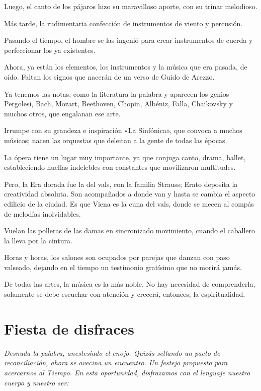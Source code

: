 \documentclass[11pt,twoside,openright,a5paper]{book}
\begin{document}
Luego, el canto de los pájaros hizo su maravilloso aporte, con su trinar melodioso.

Más tarde, la rudimentaria confección de instrumentos de viento y percusión.

Pasando el tiempo, el hombre se las ingenió para crear instrumentos de cuerda y perfeccionar los ya existentes.

Ahora, ya están los elementos, los instrumentos y la música que era pasada, de oído. Faltan los signos que nacerán de un verso de Guido de Arezzo.

Ya tenemos las notas, como la literatura la palabra y aparecen los genios Pergolesi, Bach, Mozart, Beethoven, Chopin, Albéniz, Falla, Chaikovsky y muchos otros, que engalanan ese arte.

Irrumpe con su grandeza e inspiración «La Sinfónica», que convoca a muchos músicos; nacen las orquestas que deleitan a la gente de todas las épocas.

La ópera tiene un lugar muy importante, ya que conjuga canto, drama, ballet, estableciendo huellas indelebles con constantes que movilizaron multitudes.

Pero, la Era dorada fue la del vals, con la familia Strauss; Erato deposita la creatividad absoluta. Son acompañados a donde van y hasta se cambia el aspecto edilicio de la ciudad. Es que Viena es la cuna del vals, donde se mecen al compás de melodías inolvidables.

Vuelan las polleras de las damas en sincronizado movimiento, cuando el caballero la lleva por la cintura.

Horas y horas, los salones son ocupados por parejas que danzan con paso valseado, dejando en el tiempo un testimonio gratísimo que no morirá jamás.

De todas las artes, la música es la más noble. No hay necesidad de comprenderla, solamente se debe escuchar con atención y crecerá, entonces, la espiritualidad.

\chapter*{Fiesta de disfraces}

\vspace{0.5cm}
\emph{Desnuda la palabra, anestesiado el enojo. Quizás sellando un pacto de reconciliación, ahora se avecina un encuentro. Un festejo propuesto para acercarnos al Tiempo. En esta oportunidad, disfrazamos con el lenguaje nuestro cuerpo y nuestro ser:}
\end{document}
